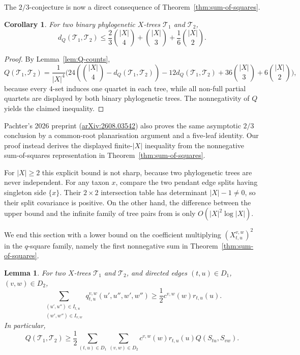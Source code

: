\documentclass[pdflatex,sn-mathphys-num]{sn-jnl}
\theoremstyle{thmstyleone}
\newtheorem{lemma}{Lemma}
\newtheorem{corollary}{Corollary}
\begin{document}
The $2/3$-conjecture is now a direct consequence of
Theorem~\ref{thm:sum-of-squares}.

\begin{corollary}\label{cor:two-thirds}
For two binary phylogenetic $X$-trees $\mathcal T_1$ and $\mathcal T_2$,
\[
d_Q(\mathcal T_1,\mathcal T_2)
\le\frac23\binom{|X|}{4}+\binom{|X|}{3}+\frac16\binom{|X|}{2}.
\]
\end{corollary}

\begin{proof}
By Lemma~\ref{lem:Q-counts},
\[
Q(\mathcal T_1,\mathcal T_2)=\frac1{|X|^4}\Biggl(
24\left(\binom{|X|}{4}-d_Q(\mathcal T_1,\mathcal T_2)\right)
-12d_Q(\mathcal T_1,\mathcal T_2)
+36\binom{|X|}{3}+6\binom{|X|}{2}\Biggr),
\]
because every $4$-set induces one quartet in each tree, while all
non-full partial quartets are displayed by both binary phylogenetic
trees.  The nonnegativity of $Q$ yields the claimed inequality.
\end{proof}

Pachter's 2026 preprint
(\href{https://arxiv.org/abs/2608.03542}{arXiv:2608.03542}) also proves the
same asymptotic $2/3$ conclusion by a common-root planarisation argument and
a five-leaf identity.  Our proof instead derives the displayed finite-$|X|$ inequality from
the nonnegative sum-of-squares representation in
Theorem~\ref{thm:sum-of-squares}.

For $|X|\ge2$ this explicit bound is not sharp, because two phylogenetic
trees are never independent.  For any taxon $x$, compare the two pendant
edge splits having singleton side $\{x\}$.  Their $2\times2$ intersection
table has determinant $|X|-1\ne0$, so their split covariance is positive.
On the other hand, the difference
between the upper bound and the infinite family of tree pairs from
\cite{ChorErdosKomornik2019} is only $O(|X|^2\log|X|)$.

We end this section with a lower bound on the coefficient multiplying
$(X_{t,u}^{v,w})^2$ in the $q$-square family, namely the first nonnegative
sum in Theorem~\ref{thm:sum-of-squares}.

\begin{lemma}\label{lem:coefficient-lower-bound}
For two $X$-trees $\mathcal T_1$ and $\mathcal T_2$, and directed edges
$(t,u)\in D_1$, $(v,w)\in D_2$,
\[
\sum_{\substack{(u',u'')\in I_{t,u}\\(w',w'')\in I_{v,w}}}
q_{t,u}^{v,w}(u',u'',w',w'')
\ge\frac12c^{v,w}(w)r_{t,u}(u).
\]
In particular,
\[
Q(\mathcal T_1,\mathcal T_2)
\ge\frac12\sum_{(t,u)\in D_1}\sum_{(v,w)\in D_2}
c^{v,w}(w)r_{t,u}(u)Q(S_{tu},S_{vw}).
\]
\end{lemma}
\end{document}
